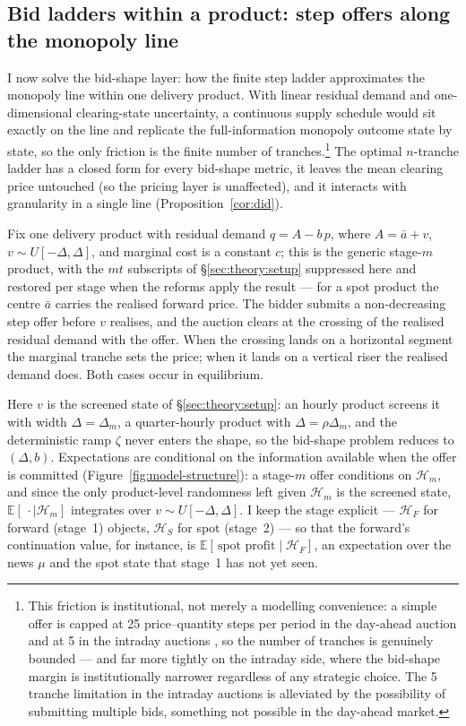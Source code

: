 \documentclass[11pt,a4paper]{article}
\theoremstyle{definition}
\theoremstyle{remark}
\theoremstyle{plain}
\begin{document}
\subsection{Bid ladders within a product: step offers along the monopoly line}\label{sec:theory:ladder}

I now solve the bid-shape layer: how the finite step ladder approximates the monopoly line within one delivery product. With linear residual demand and one-dimensional clearing-state uncertainty, a continuous supply schedule would sit exactly on the line and replicate the full-information monopoly outcome state by state, so the only friction is the finite number of tranches.\footnote{This friction is institutional, not merely a modelling convenience: a simple offer is capped at 25 price--quantity steps per period in the day-ahead auction \citep{omie_ficheros_2025} and at 5 in the intraday auctions \citep{omie_intradiario_2025}, so the number of tranches is genuinely bounded --- and far more tightly on the intraday side, where the bid-shape margin is institutionally narrower regardless of any strategic choice. The 5 tranche limitation in the intraday auctions is alleviated by the possibility of submitting multiple bids, something not possible in the day-ahead market.} The optimal $n$-tranche ladder has a closed form for every bid-shape metric, it leaves the mean clearing price untouched (so the pricing layer is unaffected), and it interacts with granularity in a single line (Proposition~\ref{cor:did}).

Fix one delivery product with residual demand $q = A - b\,p$, where $A = \bar a + v$, $v \sim U[-\Delta, \Delta]$, and marginal cost is a constant $c$; this is the generic stage-$m$ product, with the $mt$ subscripts of \S\ref{sec:theory:setup} suppressed here and restored per stage when the reforms apply the result --- for a spot product the centre $\bar a$ carries the realised forward price. The bidder submits a non-decreasing step offer before $v$ realises, and the auction clears at the crossing of the realised residual demand with the offer. When the crossing lands on a horizontal segment the marginal tranche sets the price; when it lands on a vertical riser the realised demand does. Both cases occur in equilibrium.

Here $v$ is the screened state of \S\ref{sec:theory:setup}: an hourly product screens it with width $\Delta = \Delta_m$, a quarter-hourly product with $\Delta = \rho\Delta_m$, and the deterministic ramp $\zeta$ never enters the shape, so the bid-shape problem reduces to $(\Delta, b)$. Expectations are conditional on the information available when the offer is committed (Figure~\ref{fig:model-structure}): a stage-$m$ offer conditions on $\mathcal{H}_m$, and since the only product-level randomness left given $\mathcal{H}_m$ is the screened state, $\mathbb{E}[\,\cdot \mid \mathcal{H}_m]$ integrates over $v \sim U[-\Delta,\Delta]$. I keep the stage explicit --- $\mathcal{H}_F$ for forward (stage~1) objects, $\mathcal{H}_S$ for spot (stage~2) --- so that the forward's continuation value, for instance, is $\mathbb{E}[\,\text{spot profit} \mid \mathcal{H}_F]$, an expectation over the news $\mu$ and the spot state that stage~1 has not yet seen.
\end{document}
